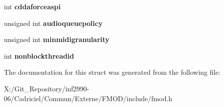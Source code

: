 \begin{DoxyCompactItemize}
\item 
\hypertarget{struct_f_m_o_d___c_r_e_a_t_e_s_o_u_n_d_e_x_i_n_f_o_a6eba4eee8813485c49042453ffdbe9bf}{int {\bfseries cddaforceaspi}}\label{struct_f_m_o_d___c_r_e_a_t_e_s_o_u_n_d_e_x_i_n_f_o_a6eba4eee8813485c49042453ffdbe9bf}

\item 
\hypertarget{struct_f_m_o_d___c_r_e_a_t_e_s_o_u_n_d_e_x_i_n_f_o_a23344f4eafd6e30b53443c6e63045684}{unsigned int {\bfseries audioqueuepolicy}}\label{struct_f_m_o_d___c_r_e_a_t_e_s_o_u_n_d_e_x_i_n_f_o_a23344f4eafd6e30b53443c6e63045684}

\item 
\hypertarget{struct_f_m_o_d___c_r_e_a_t_e_s_o_u_n_d_e_x_i_n_f_o_accd465df1d73435daae0d2ef87026362}{unsigned int {\bfseries minmidigranularity}}\label{struct_f_m_o_d___c_r_e_a_t_e_s_o_u_n_d_e_x_i_n_f_o_accd465df1d73435daae0d2ef87026362}

\item 
\hypertarget{struct_f_m_o_d___c_r_e_a_t_e_s_o_u_n_d_e_x_i_n_f_o_a99017c1720cfae07e5bd5abacf3ac2a7}{int {\bfseries nonblockthreadid}}\label{struct_f_m_o_d___c_r_e_a_t_e_s_o_u_n_d_e_x_i_n_f_o_a99017c1720cfae07e5bd5abacf3ac2a7}

\end{DoxyCompactItemize}


The documentation for this struct was generated from the following file\-:\begin{DoxyCompactItemize}
\item 
X\-:/\-Git\-\_\-\-Repository/inf2990-\/06/\-Cadriciel/\-Commun/\-Externe/\-F\-M\-O\-D/include/fmod.\-h\end{DoxyCompactItemize}
